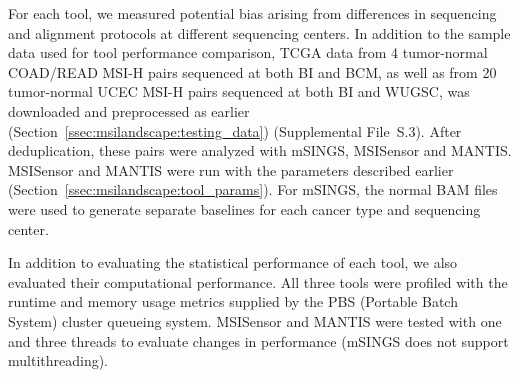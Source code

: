 For each tool, we measured potential bias arising from differences in sequencing and alignment protocols at different sequencing centers. In addition to the sample data used for tool performance comparison, TCGA data from 4 tumor-normal COAD/READ MSI-H pairs sequenced at both BI and BCM, as well as from 20 tumor-normal UCEC MSI-H pairs sequenced at both BI and WUGSC, was downloaded and preprocessed as earlier (Section~\ref{ssec:msilandscape:testing_data}) (Supplemental File~S\thechapter{}.3). After deduplication, these pairs were analyzed with mSINGS, MSISensor and MANTIS\@. MSISensor and MANTIS were run with the parameters described earlier (Section~\ref{ssec:msilandscape:tool_params}). For mSINGS, the normal BAM files were used to generate separate baselines for each cancer type and sequencing center.

In addition to evaluating the statistical performance of each tool, we also evaluated their computational performance. All three tools were profiled with the runtime and memory usage metrics supplied by the PBS (Portable Batch System) cluster queueing system. MSISensor and MANTIS were tested with one and three threads to evaluate changes in performance (mSINGS does not support multithreading).

